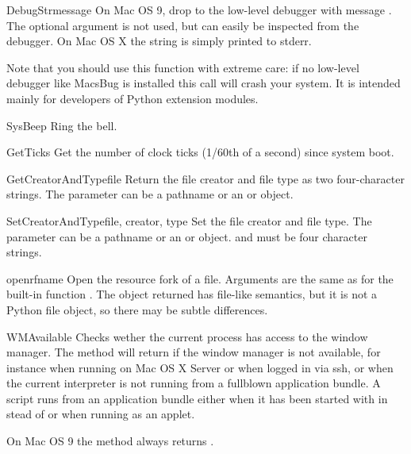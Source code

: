 \begin{funcdesc}{DebugStr}{message }
On Mac OS 9, drop to the low-level debugger with message . The
optional  argument is not used, but can easily be
inspected from the debugger. On Mac OS X the string is simply printed
to stderr.

Note that you should use this function with extreme care: if no
low-level debugger like MacsBug is installed this call will crash your
system. It is intended mainly for developers of Python extension
modules.
\end{funcdesc}

\begin{funcdesc}{SysBeep}{}
Ring the bell.
\end{funcdesc}

\begin{funcdesc}{GetTicks}{}
Get the number of clock ticks (1/60th of a second) since system boot.
\end{funcdesc}

\begin{funcdesc}{GetCreatorAndType}{file}
Return the file creator and file type as two four-character strings.
The  parameter can be a pathname or an  or 
 object.
\end{funcdesc}

\begin{funcdesc}{SetCreatorAndType}{file, creator, type}
Set the file creator and file type.
The  parameter can be a pathname or an  or 
 object.  and  must be four character
strings.
\end{funcdesc}

\begin{funcdesc}{openrf}{name }
Open the resource fork of a file. Arguments are the same as for the
built-in function . The object returned has file-like
semantics, but it is not a Python file object, so there may be subtle
differences.
\end{funcdesc}

\begin{funcdesc}{WMAvailable}{}
Checks wether the current process has access to the window manager.
The method will return  if the window manager is not available,
for instance when running on Mac OS X Server or when logged in via ssh,
or when the current interpreter is not running from a fullblown application
bundle. A script runs from an application bundle either when it has been
started with  in stead of  or when running 
as an applet.

On Mac OS 9 the method always returns .
\end{funcdesc}
